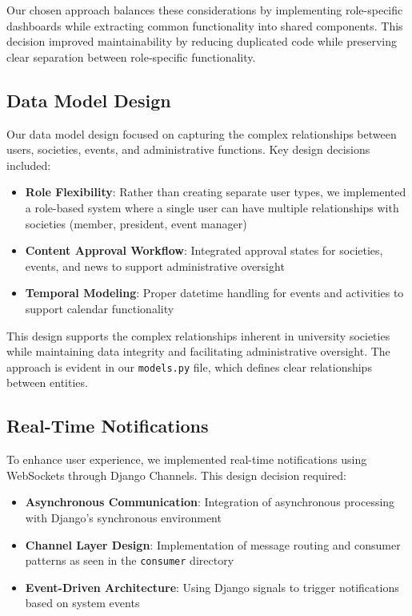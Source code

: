 Our chosen approach balances these considerations by implementing role-specific dashboards 
while extracting common functionality into shared components. This decision improved 
maintainability by reducing duplicated code while preserving clear separation between 
role-specific functionality.

\subsection{Data Model Design}

Our data model design focused on capturing the complex relationships between users, 
societies, events, and administrative functions. Key design decisions included:

\begin{itemize}
    \item \textbf{Role Flexibility}: Rather than creating separate user types, we 
    implemented a role-based system where a single user can have multiple relationships
     with societies (member, president, event manager)
    \item \textbf{Content Approval Workflow}: Integrated approval states for societies, 
    events, and news to support administrative oversight
    \item \textbf{Temporal Modeling}: Proper datetime handling for events and activities 
    to support calendar functionality
\end{itemize}

This design supports the complex relationships inherent in university societies while 
maintaining data integrity and facilitating administrative oversight. The approach is 
evident in our \texttt{models.py} file, which defines clear relationships between 
entities.

\subsection{Real-Time Notifications}

To enhance user experience, we implemented real-time notifications using WebSockets 
through Django Channels. This design decision required:

\begin{itemize}
    \item \textbf{Asynchronous Communication}: Integration of asynchronous processing 
    with Django's synchronous environment
    \item \textbf{Channel Layer Design}: Implementation of message routing and consumer 
    patterns as seen in the \texttt{consumer} directory
    \item \textbf{Event-Driven Architecture}: Using Django signals to trigger notifications
    based on system events
\end{itemize}


